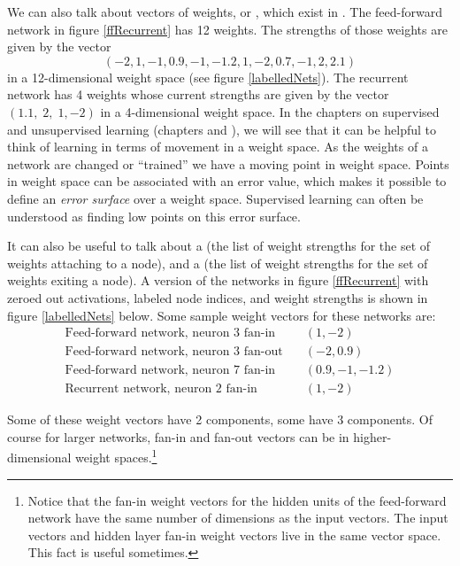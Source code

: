 We can also talk about vectors of weights, or , which exist in . The feed-forward network in figure \ref{ffRecurrent} has 12 weights. The strengths of those weights are given by the vector
\begin{equation*}
(-2, 1, -1, 0.9, -1, -1.2, 1, -2, 0.7, -1, 2, 2.1)
\end{equation*}
in a 12-dimensional weight space (see figure \ref{labelledNets}). The recurrent network has 4 weights whose current strengths are given by the vector $(1.1,\; 2,\; 1,-2)$ in a 4-dimensional weight space. In the chapters on supervised and unsupervised learning (chapters  and ), we will see that it can be helpful to think of learning in terms of movement in a weight space. As the weights of a network are changed or ``trained'' we have a moving point in weight space. Points in weight space can be associated with an error value, which makes it possible to define an \emph{error surface} over a weight space. Supervised learning can often be understood as finding low points on this error surface.

It can also be useful to talk about a  (the list of weight strengths for the set of weights attaching to a node), and a  (the list of weight strengths for the set of weights exiting a node). A version of the networks in figure \ref{ffRecurrent} with zeroed out activations, labeled node indices, and weight strengths  is shown in figure \ref{labelledNets} below. Some sample weight vectors for these networks are:
\begin{align*}
\text{Feed-forward network, neuron 3 fan-in} &\quad (1,-2) \\
\text{Feed-forward network, neuron 3 fan-out} &\quad (-2,0.9) \\
\text{Feed-forward network, neuron 7 fan-in} &\quad (0.9,-1,-1.2) \\
\text{Recurrent network, neuron 2 fan-in} &\quad (1,-2)
\end{align*}

Some of these weight vectors have 2 components, some have 3 components. Of course for larger networks, fan-in and fan-out vectors can be in higher-dimensional weight spaces.\footnote{Notice that the fan-in weight vectors for the hidden units of the feed-forward network have the same number of dimensions as the input vectors. The input vectors and hidden layer fan-in weight vectors live in the same vector space. This fact is useful sometimes.}

